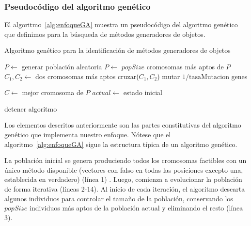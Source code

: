 \subsubsection{Pseudocódigo del algoritmo genético}

El algoritmo~\ref{alg:enfoqueGA} muestra un pseudocódigo del algoritmo genético que definimos para la búsqueda de métodos generadores de objetos.


\begin{algorithm}
  \caption{Algoritmo genético para la identificación de métodos generadores de
  objetos}
  \label{alg:enfoqueGA}
  \begin{algorithmic}[1]
  
  \STATE $P \gets$ generar población aleatoria
      \STATE $P \gets$ $popSize$ cromosomas más aptos de $P$
          \STATE $C_1, C_2 \gets$ dos cromosomas más aptos 
          \STATE cruzar($C_1, C_2$)
      \ENDFOR
          \STATE mutar $1/\text{tasaMutacion}$ genes
      \ENDFOR
  
    \STATE $C \gets$ mejor cromosoma de $P$
    \STATE $actual \gets$ estado inicial

        \STATE detener algoritmo
    \ENDIF
\ENDFOR

\end{algorithmic}
\end{algorithm}


Los elementos descritos anteriormente son las partes constitutivas del algoritmo genético que implementa nuestro enfoque. 
Nótese que el algoritmo~\ref{alg:enfoqueGA} sigue la estructura típica de un algoritmo genético. 

La población inicial se genera produciendo todos los cromosomas factibles con un
único método disponible (vectores con falso en todas las posiciones excepto una,
establecida en verdadero) (línea 1) . 
Luego, comienza a evolucionar la población de forma iterativa (líneas 2-14). 
Al inicio de cada iteración, el algoritmo descarta algunos individuos para controlar el tamaño de la población, conservando los $popSize$ individuos más aptos de la población actual y eliminando el resto (línea 3).


